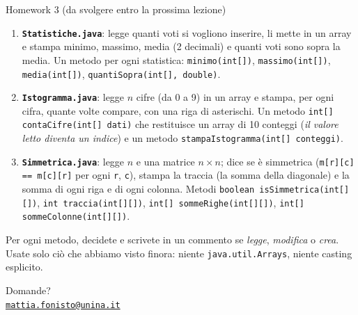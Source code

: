 \documentclass[10pt,aspectratio=169]{beamer}
\begin{document}
\begin{frame}{Homework 3 (da svolgere entro la prossima lezione)}
\begin{enumerate}\itemsep=5pt
    \item \textbf{\texttt{Statistiche.java}}: legge quanti voti si vogliono inserire, li mette in un array e stampa minimo, massimo, media (2 decimali) e quanti voti sono sopra la media. Un metodo per ogni statistica: \texttt{minimo(int[])}, \texttt{massimo(int[])}, \texttt{media(int[])}, \texttt{quantiSopra(int[], double)}.
    \item \textbf{\texttt{Istogramma.java}}: legge $n$ cifre (da 0 a 9) in un array e stampa, per ogni cifra, quante volte compare, con una riga di asterischi. Un metodo \texttt{int[] contaCifre(int[] dati)} che restituisce un array di 10 conteggi (\emph{il valore letto diventa un indice}) e un metodo \texttt{stampaIstogramma(int[] conteggi)}.
    \item \textbf{\texttt{Simmetrica.java}}: legge $n$ e una matrice $n \times n$; dice se è simmetrica (\texttt{m[r][c] == m[c][r]} per ogni \texttt{r}, \texttt{c}), stampa la traccia (la somma della diagonale) e la somma di ogni riga e di ogni colonna. Metodi \texttt{boolean isSimmetrica(int[][])}, \texttt{int traccia(int[][])}, \texttt{int[] sommeRighe(int[][])}, \texttt{int[] sommeColonne(int[][])}.
\end{enumerate}

\vspace{0.3cm}
\small Per ogni metodo, decidete e scrivete in un commento se \emph{legge}, \emph{modifica} o \emph{crea}. Usate solo ciò che abbiamo visto finora: niente \texttt{java.util.Arrays}, niente casting esplicito.
\end{frame}

\begin{frame}
\begin{center}
{\Huge Domande?}\\[2.5em]
{\normalsize \href{mailto:mattia.fonisto@unina.it}{\texttt{mattia.fonisto@unina.it}}}
\end{center}
\end{frame}
\end{document}
